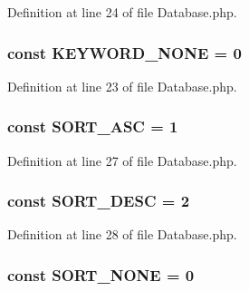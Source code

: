 Definition at line 24 of file Database.\+php.

\hypertarget{class_database_a9b1a24ef01d468c146a71b333edb0c17}{}
\subsubsection[{K\+E\+Y\+W\+O\+R\+D\+\_\+\+N\+O\+N\+E}]{\setlength{\rightskip}{0pt plus 5cm}const K\+E\+Y\+W\+O\+R\+D\+\_\+\+N\+O\+N\+E = 0}\label{class_database_a9b1a24ef01d468c146a71b333edb0c17}


Definition at line 23 of file Database.\+php.

\hypertarget{class_database_a9517f2622dfc5fbb0cc64feef247eb06}{}
\subsubsection[{S\+O\+R\+T\+\_\+\+A\+S\+C}]{\setlength{\rightskip}{0pt plus 5cm}const S\+O\+R\+T\+\_\+\+A\+S\+C = 1}\label{class_database_a9517f2622dfc5fbb0cc64feef247eb06}


Definition at line 27 of file Database.\+php.

\hypertarget{class_database_a0e633ab431ae1e5cc483a37cfe73bb09}{}
\subsubsection[{S\+O\+R\+T\+\_\+\+D\+E\+S\+C}]{\setlength{\rightskip}{0pt plus 5cm}const S\+O\+R\+T\+\_\+\+D\+E\+S\+C = 2}\label{class_database_a0e633ab431ae1e5cc483a37cfe73bb09}


Definition at line 28 of file Database.\+php.

\hypertarget{class_database_af3826c676cb54905f393f9d1f7ad48ea}{}
\subsubsection[{S\+O\+R\+T\+\_\+\+N\+O\+N\+E}]{\setlength{\rightskip}{0pt plus 5cm}const S\+O\+R\+T\+\_\+\+N\+O\+N\+E = 0}\label{class_database_af3826c676cb54905f393f9d1f7ad48ea}


